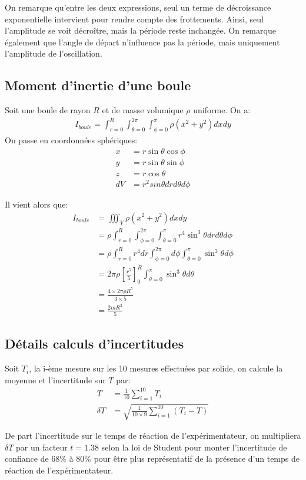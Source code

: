 \documentclass[11pt]{article}
\begin{document}
On remarque qu'entre les deux expressions, seul un terme de décroissance exponentielle intervient pour rendre compte des frottements.
Ainsi, seul l'amplitude se voit décroître, mais la période reste inchangée.
On remarque également que l'angle de départ n'influence pas la période, mais uniquement l'amplitude de l'oscillation.

\subsection{Moment d'inertie d'une boule}
\label{boule}
Soit une boule de rayon $R$ et de masse volumique $\rho$ uniforme. On a:
\begin{align}
    I_{boule} = \int_{r=0}^{R}\int_{\theta=0}^{2\pi}\int_{\phi=0}^{\pi} \rho (x^2 + y^2) dxdy
\end{align}
On passe en coordonnées sphériques:
\begin{align*}
    x &= r \sin \theta \cos \phi \\
    y &= r \sin \theta \sin \phi \\
    z &= r \cos \theta \\
    dV &= r^2 sin \theta dr d\theta d\phi
\end{align*}

\break
Il vient alors que:
\begin{align*}
    I_{boule} & = \iiint_V \rho (x^2 + y^2) dxdy \\
    & = \rho \int_{r=0}^{R}\int_{\phi=0}^{2\pi}\int_{\theta=0}^{\pi} r^4 \sin^3 \theta dr d\theta d\phi \\
    & = \rho \int_{r=0}^{R} r^4 dr \int_{\phi=0}^{2\pi} d\phi \int_{\theta=0}^{\pi} \sin^3 \theta d\phi \\
    & = 2\pi \rho \left[ \frac{r^5}{5} \right]_0^R \int_{\theta=0}^{\pi} \sin^3 \theta d\theta \\
    & = \frac{4 \times 2 \pi \rho R^5}{3 \times 5 } \\
    & = \frac{2 m R^3}{5}
\end{align*}

\subsection{Détails calculs d'incertitudes}
\label{incertitude}

Soit $T_i$, la i-ème mesure sur les 10 mesures effectuées par solide, on calcule la moyenne et l'incertitude sur $T$ par:
\begin{align*}
    T &= \frac{1}{10} \sum_{i=1}^{10} T_i \\
    \delta T &= \sqrt{\frac{1}{10 \times 9} \sum_{i=1}^{10} (T_i - T)}
\end{align*}

De part l'incertitude sur le temps de réaction de l'expérimentateur, on multipliera $\delta T$ par un facteur $t = 1.38$ selon la loi de Student pour monter
l'incertitude de confiance de $68\%$ à $80\%$ pour être plus représentatif de la présence d'un temps de réaction de l'expérimentateur.
\end{document}
